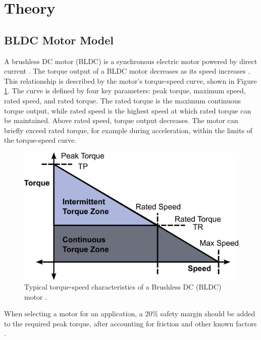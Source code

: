 \section{Theory}

\subsection{BLDC Motor Model}
    \label{sec:bldc_theory}

    A brushless DC motor (BLDC) is a synchronous electric motor powered by direct current \cite{PMSM_BOOK}. The torque output of a BLDC motor decreases as its speed increases \cite{Microchip_BLDC}. This relationship is described by the motor's torque-speed curve, shown in Figure \ref{fig:bldc_torque_speed}. The curve is defined by four key parameters: peak torque, maximum speed, rated speed, and rated torque. The rated torque is the maximum continuous torque output, while rated speed is the highest speed at which rated torque can be maintained. Above rated speed, torque output decreases. The motor can briefly exceed rated torque, for example during acceleration, within the limits of the torque-speed curve.

    \begin{figure}[H]
        \centering
        \includegraphics[width=\textwidth]{Images/torque_speed_own.png}
        \caption{Typical torque-speed characteristics of a Brushless DC (BLDC) motor \cite{Microchip_BLDC}. }
        \label{fig:bldc_torque_speed}
    \end{figure}

    When selecting a motor for an application, a 20\% safety margin should be added to the required peak torque, after accounting for friction and other known factors \cite{Microchip_BLDC}.

